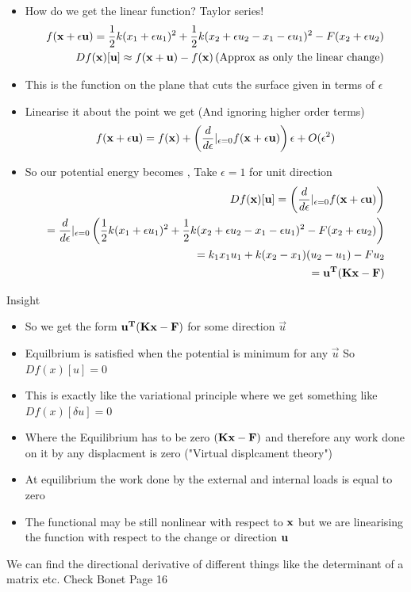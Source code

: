 	\begin{frame}
		\begin{itemize}
			\item How do we get the linear function? Taylor series!
			\begin{align*}
			f(\mathbf{x+\epsilon u}) = \frac{1}{2}k(x_1+\epsilon u_1)^2 + \frac{1}{2}k(x_2 + \epsilon u_2-x_1-\epsilon u_1)^2 - F(x_2 + \epsilon u_2) \\ 
			Df(\mathbf{x})[\mathbf{u}] \approx f(\mathbf{x+u}) - f(\mathbf{x}) \left(\text{Approx as only the linear change} \right)			
			\end{align*}
			\item This is the function on the plane that cuts the surface given in terms of $\epsilon$
			\item Linearise it about the point we get (And ignoring higher order terms)
			\begin{align*}
				f(\mathbf{x+\epsilon u}) = f(\mathbf{x}) + \left(\frac{ d}{ d\epsilon}|_{\epsilon = 0} f(\mathbf{x+\epsilon u}) \right) \epsilon + O(\epsilon^2)
			\end{align*}
			\item So our potential energy becomes , Take $\epsilon =1$ for unit direction
			\begin{align*}
			Df(\mathbf{x})[\mathbf{u}] = \left(\frac{ d}{ d\epsilon}|_{\epsilon = 0} f(\mathbf{x+\epsilon u}) \right) \\
			= \frac{ d}{ d\epsilon}|_{\epsilon = 0}\left(  \frac{1}{2}k(x_1+\epsilon u_1)^2 + \frac{1}{2}k(x_2 + \epsilon u_2-x_1-\epsilon u_1)^2 - F(x_2 + \epsilon u_2) \right) \\
			=k_1x_1u_1 + k(x_2-x_1)(u_2-u_1) - Fu_2 \\
			= \mathbf{u^T(Kx-F)}
			\end{align*}
		\end{itemize}
	\end{frame}

	\begin{frame}{Insight}
		\begin{itemize}
			\item So we get the form $\mathbf{u^T(Kx-F)}$ for some direction $\vec{u}$
			\item Equilbrium is satisfied when the potential is minimum for any $\vec{u}$ So $Df(x)[u] =0$
			\item This is exactly like the variational principle where we get something like $Df(x)[\delta u] =0$
			\item Where the Equilibrium has to be zero  $\mathbf{(Kx-F)}$ and therefore any work done on it by any displacment is zero ("Virtual displcament theory")
			\item At equilibrium the work done by the external and internal loads is equal to zero
			\item The functional may be still nonlinear with respect to $\mathbf{x}$ but we are linearising the function with respect to the change or direction $\mathbf{u}$ 
		\end{itemize}
	\end{frame}

	\begin{frame}
		 We can find the directional derivative of different things like the determinant of a matrix etc. Check Bonet Page 16
	\end{frame}

